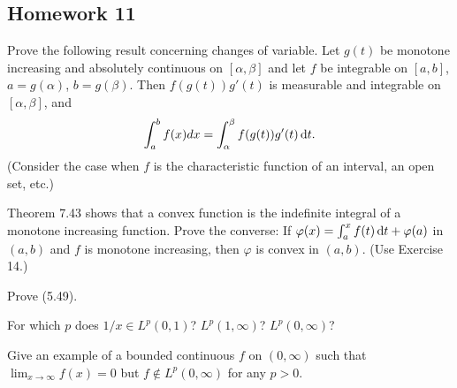 \subsection{Homework 11}
\begin{problem}
Prove the following result concerning changes of variable. Let $g(t)$ be
monotone increasing and absolutely continuous on $[\alpha,\beta]$ and let $f$
be integrable on $[a,b]$, $a= g(\alpha)$, $b=
g(\beta)$. Then $f(g(t))g'(t)$ is measurable and integrable on
$[\alpha,\beta]$, and
\[
\int_a^b f(x)d x=\int_\alpha^\beta f(g(t))g'(t)\mathop{}\!\mathrm{d} t.
\]
(Consider the case when $f$ is the characteristic function of an interval,
an open set, etc.)
\end{problem}
\begin{solution}
\end{solution}

\begin{problem}
Theorem 7.43 shows that a convex function is the indefinite integral of a
monotone increasing function. Prove the converse: If
$\varphi(x)=\int_a^xf(t)\mathop{}\!\mathrm{d} t+\varphi(a)$ in $(a,b)$ and $f$ is monotone
increasing, then $\varphi$ is convex in $(a,b)$. (Use Exercise 14.)
\end{problem}
\begin{solution}
\end{solution}

\begin{problem}
Prove (5.49).
\end{problem}
\begin{solution}
\end{solution}

\begin{problem}
For which $p$ does $1/x\in L^p(0,1)$? $L^p(1,\infty)$? $L^p(0,\infty)$?
\end{problem}
\begin{solution}
\end{solution}

\begin{problem}
Give an example of a bounded continuous $f$ on $(0,\infty)$ such that
$\lim_{x\to\infty}f(x)=0$ but $f\notin L^p(0,\infty)$ for any $p>0$.
\end{problem}
\begin{solution}
\end{solution}

